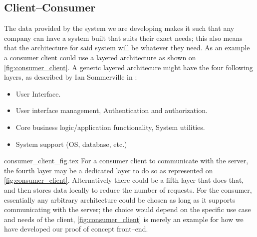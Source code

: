 \subsection{Client--Consumer}
The data provided by the system we are developing makes it such that any company can have a system built that suits their exact needs; this also means that the architecture for said system will be whatever they need.
As an example a consumer client could use a layered architecture as shown on \cref{fig:consumer_client}.
A generic layered architecure might have the four following layers, as described by Ian Sommerville in \cite{software_engineering}:
\begin{itemize}
    \item User Interface.
    \item User interface management, Authentication and authorization.
    \item Core business logic/application functionality, System utilities.
    \item System support (OS, database, etc.)
\end{itemize}
{consumer_client_fig.tex}
For a consumer client to communicate with the server, the fourth layer may be a dedicated layer to do so as represented on \cref{fig:consumer_client}.
Alternatively there could be a fifth layer that does that, and then stores data locally to reduce the number of requests.
For the consumer, essentially any arbitrary architecture could be chosen as long as it supports communicating with the server; the choice would depend on the specific use case and needs of the client, \cref{fig:consumer_client} is merely an example for how we have developed our proof of concept front--end.

